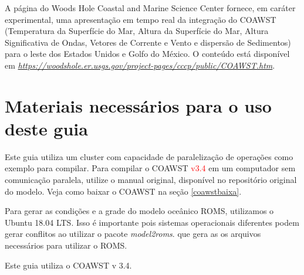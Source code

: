 \noindent A página do Woods Hole Coastal and Marine Science Center fornece, em caráter experimental, uma apresentação em 
          tempo real da integração do COAWST (Temperatura da Superfície do Mar, Altura da Superfície do Mar, Altura Significativa
          de Ondas, Vetores de Corrente e Vento e dispersão de Sedimentos) para o leste dos Estados Unidos e Golfo do México.
          O conteúdo está disponível em \textcolor{bleu_cite}{\href{https://woodshole.er.usgs.gov/project-pages/cccp/public/COAWST.htm}{\textit{https://woodshole.er.usgs.gov/project-pages/cccp/public/COAWST.htm}}}.
\bigskip

\section{Materiais necessários para o uso deste guia}
\bigskip

\noindent Este guia utiliza um cluster com capacidade de paralelização de operações como exemplo para compilar. Para compilar o COAWST \textcolor{red}{v3.4}
          em um computador sem comunicação paralela, utilize o manual original, disponível no repositório original do modelo. 
          Veja como baixar o COAWST na seção \textcolor{bleu_cite}{\ref{coawstbaixa}}.
\bigskip

\noindent Para gerar as condições e a grade do modelo oceânico ROMS, utilizamos o Ubuntu 18.04 LTS. Isso é importante pois sistemas
          operacionais diferentes podem gerar conflitos ao utilizar o pacote \textit{model2roms}. que gera as os arquivos necessários para utilizar o ROMS.
\bigskip

\begin{tcolorbox}[enhanced,
    grow to left by=0cm,%
    grow to right by=0cm,%
    enlarge top by=0cm,%
    enlarge bottom by=0cm,%
    tcbox raise base,
    boxrule=1.0pt,
    left=18mm,
    colframe=red!50!black,coltext=red!25!black,colback=red!10!white,
    overlay={\begin{tcbclipinterior}\fill[red!75!blue!50!white] (frame.south west)
      rectangle node[text=white,font=\sffamily\bfseries\footnotesize,rotate=0] {ATENÇÃO} ([xshift=18mm]frame.north west);\end{tcbclipinterior}}]
  Este guia utiliza o COAWST v 3.4.
  \end{tcolorbox}
  \bigskip